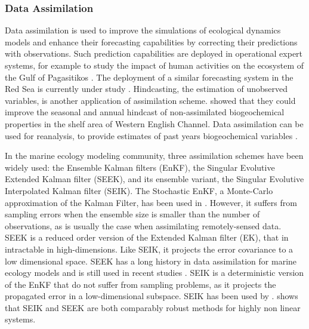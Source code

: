 \subsubsection{Data Assimilation}

Data assimilation is used to improve the simulations of ecological dynamics models and enhance their forecasting capabilities by correcting their predictions with observations. Such prediction capabilities are deployed in operational expert systems, for example to study the impact of human activities on the ecosystem of the Gulf of Pagasitikos \cite{Korres2012}. The deployment of a similar forecasting system in the Red Sea is currently under study \cite{Triantafyllou2014}. Hindcasting, the estimation of unobserved variables, is another application of assimilation scheme. \cite{Ciavatta2011}  showed that they could improve the seasonal and annual hindcast of non-assimilated biogeochemical properties in the shelf area of Western English Channel. Data assimilation can be used for reanalysis, to provide estimates of past years biogeochemical variables \cite{Fontana2013}. 

In the marine ecology modeling community, three assimilation schemes have been widely used: the Ensemble Kalman filters (EnKF), the Singular Evolutive Extended Kalman filter (SEEK), and its ensemble variant, the Singular Evolutive Interpolated Kalman filter (SEIK). The Stochastic EnKF, a Monte-Carlo approximation of the Kalman Filter, has been used in \cite{Ciavatta2011, Ciavatta2014}. However, it suffers from sampling errors when the ensemble size is smaller than the number of observations, as is usually the case when assimilating remotely-sensed data. SEEK is a reduced order version of the Extended Kalman filter (EK), that in intractable in high-dimensions. Like SEIK, it projects the error covariance to a low dimensional space. SEEK has a long history in data assimilation for marine ecology models and is still used in recent studies \cite{Fontana2013, Korres2012, Butenschon2012}. SEIK is a deterministic version of the EnKF that do not suffer from sampling problems, as it projects the propagated error in a low-dimensional subspace. SEIK has been used by \cite{Triantafyllou2012, Korres2012}. \cite{Korres2012} shows that SEIK and SEEK are both comparably robust methods for highly non linear systems.

